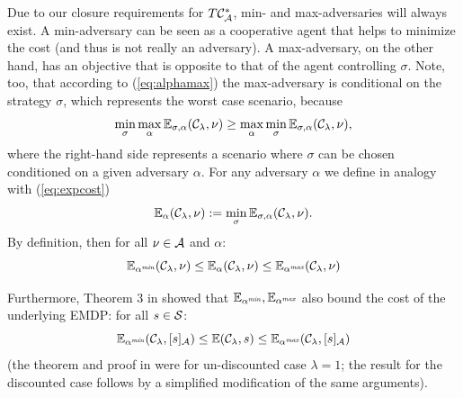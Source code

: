\documentclass{llncs}
\begin{document}
Due to our closure requirements for $T\mathcal{C}^*_{\mathcal{A}}$, min- and max-adversaries will always exist. A min-adversary
can be seen as a cooperative agent that helps to minimize the cost (and thus is not really an adversary). A max-adversary,
on the other hand, has an objective that is opposite to that of the agent controlling $\sigma$. Note, too,
that according to (\ref{eq:alphamax}) the max-adversary is conditional on the strategy $\sigma$,
which represents the worst case scenario, because
\begin{displaymath}
\min_{\sigma}\max_{\alpha}\mathbb{E}_{\sigma,\alpha}(\mathcal{C}_\lambda,\nu) \geq
\max_{\alpha}\min_{\sigma}\mathbb{E}_{\sigma,\alpha}(\mathcal{C}_\lambda,\nu), 
\end{displaymath}
where the right-hand side represents a scenario where $\sigma$ can be chosen conditioned on a
given adversary $\alpha$.
For any adversary $\alpha$ we define in analogy with (\ref{eq:expcost})
\begin{equation}
\label{eq:costforalpha}
\mathbb{E}_{\alpha}(\mathcal{C}_\lambda,\nu):=\min_\sigma\mathbb{E}_{\sigma,\alpha}(\mathcal{C}_\lambda,\nu).
\end{equation}
By definition, then for all $\nu\in\mathcal{A}$ and $\alpha$:
\begin{equation}
\label{eq:alphabounds1}
\mathbb{E}_{\alpha^{\emph{min}}}(\mathcal{C}_\lambda,\nu)\leq
\mathbb{E}_{\alpha}(\mathcal{C}_\lambda,\nu)\leq
\mathbb{E}_{\alpha^{\emph{max}}}(\mathcal{C}_\lambda,\nu)
\end{equation}

Furthermore, Theorem 3 in \cite{jaeger2020approximating} showed that $\mathbb{E}_{\alpha^{\emph{min}}},\mathbb{E}_{\alpha^{\emph{max}}}$ also
bound the cost of the underlying EMDP: for all $s\in\mathcal{S}$:
\begin{equation}
\label{eq:alphabounds2}
\mathbb{E}_{\alpha^{\emph{min}}}(\mathcal{C}_\lambda,[s]_{\mathcal{A}})\leq
\mathbb{E}(\mathcal{C}_\lambda,s)\leq
\mathbb{E}_{\alpha^{\emph{max}}}(\mathcal{C}_\lambda,[s]_{\mathcal{A}})
\end{equation}
(the theorem and proof in  \cite{jaeger2020approximating} were for un-discounted case $\lambda=1$; the result
for the discounted case follows by a simplified modification of the same arguments). 
\end{document}
